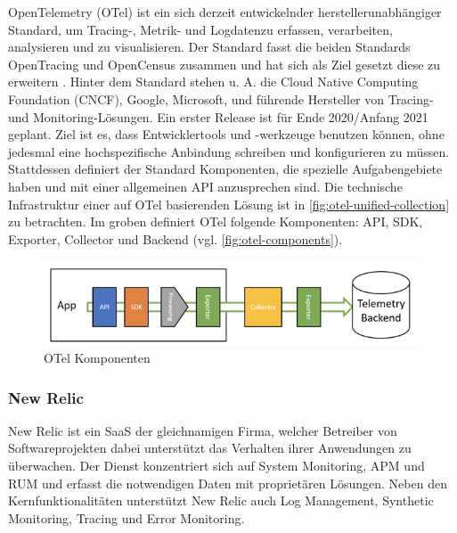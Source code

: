 OpenTelemetry (OTel) \cite{OpenTelemetry} ist ein sich derzeit entwickelnder herstellerunabhängiger Standard, um Tracing-, Metrik- und Logdaten\footnotemark zu erfassen, verarbeiten, analysieren und zu visualisieren. Der Standard fasst die beiden Standards OpenTracing und OpenCensus \cite{OpenCensus} zusammen und hat sich als Ziel gesetzt diese zu erweitern \cite{UseNixDistributiveTracing}. Hinter dem Standard stehen u. A. die Cloud Native Computing Foundation (CNCF), Google, Microsoft, und führende Hersteller von Tracing- und Monitoring-Lösungen. Ein erster Release ist für Ende 2020/Anfang 2021 geplant. Ziel ist es, dass Entwicklertools und -werkzeuge benutzen können, ohne jedesmal eine hochspezifische Anbindung schreiben und konfigurieren zu müssen. Stattdessen definiert der Standard Komponenten, die spezielle Aufgabengebiete haben und mit einer allgemeinen API anzusprechen sind. Die technische Infrastruktur einer auf OTel basierenden Lösung ist in \autoref{fig:otel-unified-collection} zu betrachten. Im groben definiert OTel folgende Komponenten: API, SDK, Exporter, Collector und Backend (vgl. \autoref{fig:otel-components}).


\begin{figure}[H]
	\centering
	\includegraphics[width=0.55\linewidth]{img/03_methoden/dynatrace_otel-components.png}
	\caption{OTel Komponenten \cite{DynatraceOTelComponents}}
	\label{fig:otel-components}
\end{figure}

\subsubsection{New Relic}

New Relic \cite{NewRelic} ist ein SaaS der gleichnamigen Firma, welcher Betreiber von Softwareprojekten dabei unterstützt das Verhalten ihrer Anwendungen zu überwachen. Der Dienst konzentriert sich auf System Monitoring, APM und RUM und erfasst die notwendigen Daten mit proprietären Lösungen. Neben den Kernfunktionalitäten unterstützt New Relic auch Log Management, Synthetic Monitoring, Tracing und Error Monitoring.

